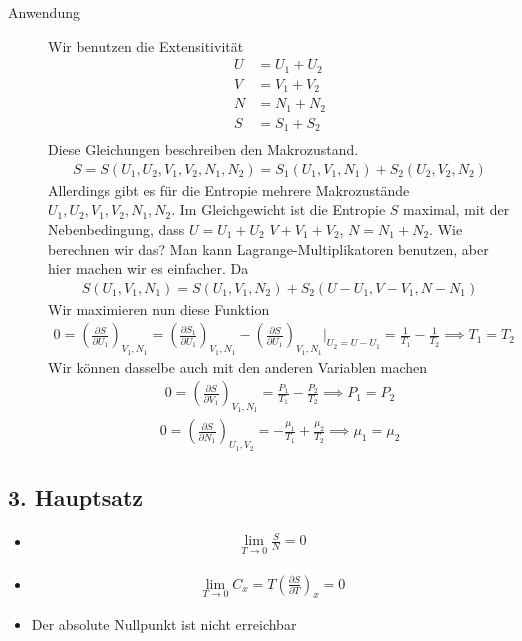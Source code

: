 \documentclass[11pt]{article}
\theoremstyle{plain}
\theoremstyle{mytheoremstyle}
\newcommand{\pd}[2]{\frac{\partial #1 }{\partial #2}}
\begin{document}
\begin{description}
  \item[Anwendung] Wir benutzen die Extensitivität
    \begin{align*}
      U &= U_1 + U_2 \\
      V &= V_1 + V_2 \\
      N &= N_1 + N_2 \\
      S &= S_1 + S_2 \\
    \end{align*}
    Diese Gleichungen beschreiben den Makrozustand.
    \begin{align*}
      S = S(U_1, U_2, V_1, V_2, N_1, N_2) = S_1 (U_1, V_1, N_1) + 
      S_2 ( U_2, V_2, N_2)
    \end{align*}
    Allerdings gibt es für die Entropie mehrere Makrozustände 
    $U_1, U_2, V_1, V_2, N_1, N_2$.
    Im Gleichgewicht ist die Entropie $S$ maximal, mit der Nebenbedingung, 
    dass $U = U_1 + U_2$ $V + V_1 + V_2$, $N = N_1 + N_2$.
    Wie berechnen wir das? Man kann Lagrange-Multiplikatoren benutzen, aber
    hier machen wir es einfacher. Da
    \begin{align*}
      S(U_1, V_1, N_1) = S (U_1, V_1, N_2) + S_2 (U- U_1, V- V_1, N- N_1)
    \end{align*}
    Wir maximieren nun diese Funktion
    \begin{align*}
      0 = \left( \pd{S}{U_1} \right)_{V_1, N_1} = \left( \pd{S_1}{U_1} \right)_{V_1, N_1}
      - \left( \pd{S}{U_1} \right)_{V_1, N_1} |_{U_2 = U - U_1}
      =\frac{1}{T_1} -\frac{1}{T_2} \implies T_1 = T_2
    \end{align*}
    Wir können dasselbe auch mit den anderen Variablen machen
    \begin{align*}
     0 =  \left( \pd{S}{V_1} \right)_{V_1, N_1} =\frac{P_1}{T_1} -\frac{P_2}{T_2}
     \implies P_1 = P_2
    \end{align*}
    \begin{align*}
      0 = \left( \pd{S}{N_1} \right)_{U_1, V_2} = -\frac{ \mu_1}{T_1} + 
\frac{      \mu_2}{T_2} \implies \mu_1 = \mu_2
    \end{align*}
    
    
\end{description}
\subsection*{3. Hauptsatz}
\begin{itemize}
  \item %
    \begin{align*}
      \lim_{T\to  0 } 
      \frac{    S}{N} = 0
    \end{align*}
  \item %
    \begin{align*}
      \lim_{T \to 0}
      C_x = T \left( \pd{S}{T} \right)_{x} = 0
    \end{align*}
  \item Der absolute Nullpunkt ist nicht erreichbar
\end{itemize}
\end{document}
